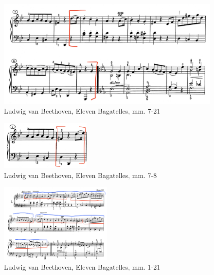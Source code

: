 \begin{figure}
  \centering
  \includegraphics[width=\textwidth]{figures/beethoven-first-a-section-bars-nine-to-sixteen.jpg}
  \caption{Ludwig van Beethoven, Eleven Bagatelles, mm. 7-21}
  \label{fig:beethoven-first-a-section-bars-nine-to-sixteen}
\end{figure}

\begin{figure}
	\centering
	\includegraphics[width=0.4\textwidth]{figures/beethoven-first-a-section-hc.jpg}
	\caption{Ludwig van Beethoven, Eleven Bagatelles, mm. 7-8}
	\label{fig:beethoven-first-a-section-hc}
\end{figure}

\begin{figure}
	\centering
	\includegraphics[width=0.5\textwidth]{figures/beethoven-first-a-section-structure.jpg}
	\caption{Ludwig van Beethoven, Eleven Bagatelles, mm. 1-21}
	\label{fig:beethoven-first-a-section-structure}
\end{figure}


